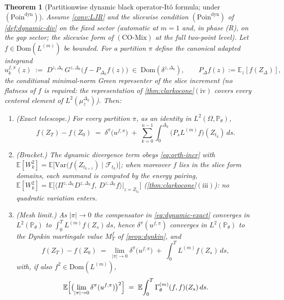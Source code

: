 \documentclass[reqno,final,11pt]{amsart}
\theoremstyle{plain}
\newtheorem{theorem}{Theorem}[section]
\theoremstyle{definition}
\theoremstyle{remark}
\newcommand{\E}{\mathbb E}
\newcommand{\Prob}{\mathbb P}
\newcommand{\Dom}{\mathrm{Dom}}
\newcommand{\cF}{\mathcal F}
\newcommand{\Pth}{\Prob_{\theta}}
\newcommand{\COmix}{(\mathrm{CO\text{-}Mix})}
\begin{document}
\begin{theorem}[Partitionwise dynamic black operator-It\^o formula; under $(\mathrm{Poin}^{\mathrm{dyn}})$]\label{thm:dynamic}
Assume \cref{conv:LJR} and the slicewise condition
$(\mathrm{Poin}^{\mathrm{dyn}})$ of \cref{def:dynamic-div} on the fixed
sector (automatic at $m=1$ and, in phase
\textnormal{(R)}, on the gap sector; the slicewise form of $\COmix$ at the
full two-point level). Let $f\in\Dom(L^{(m)})$ be bounded. For a partition $\pi$ define the
canonical adapted integrand
\[
  u^{f,\pi}_k(z)\;:=\;D^{z,\Delta_k}\,G^{z,\Delta_k}\bigl(f-P_{\Delta_k}f(z)\bigr)
  \;\in\;\Dom(\delta^{z,\Delta_k}),
  \qquad P_\Delta f(z):=\E_z[f(Z_\Delta)] ,
\]
the conditional minimal-norm Green representer of the slice increment (no
flatness of $f$ is required: the representation of
\cref{thm:clarkocone}$(\mathrm{iv})$ covers every centered element of
$L^2(\mu^{\Delta_k}_z)$). Then:
\begin{enumerate}
\item[$(\mathrm i)$] (Exact telescope.) For every partition $\pi$,
as an identity in $L^2(\Omega,\Pth)$,
\begin{equation}\label{eq:dynamic-exact}
  f(Z_T)-f(Z_0)\;=\;\delta^{\pi}\bigl(u^{f,\pi}\bigr)
  \;+\;\sum_{k=0}^{n-1}\int_0^{\Delta_k}\bigl(P_sL^{(m)}f\bigr)(Z_{t_k})\,ds .
\end{equation}
\item[$(\mathrm{ii})$] (Bracket.) The dynamic divergence term obeys
\eqref{eq:orth-incr} with
$\E[W_k^2]=\E\bigl[\mathrm{Var}\bigl(f(Z_{t_{k+1}})\mid\cF_{t_k}\bigr)\bigr]$;
when moreover $f$ lies in the slice form domains, each summand is computed by
the energy pairing,
$\E[W_k^2]=\E\bigl[\langle\Pi^{z,\Delta_k}D^{z,\Delta_k}f,\
D^{z,\Delta_k}f\rangle\big|_{z=Z_{t_k}}\bigr]$
(\cref{thm:clarkocone}$(\mathrm{iii})$): no quadratic variation enters.
\item[$(\mathrm{iii})$] (Mesh limit.) As $|\pi|\to0$ the compensator in
\eqref{eq:dynamic-exact} converges in $L^2(\Pth)$ to
$\int_0^TL^{(m)}f(Z_s)\,ds$, hence $\delta^{\pi}(u^{f,\pi})$ converges in
$L^2(\Pth)$ to the Dynkin martingale value $M^f_T$ of \cref{prop:dynkin}, and
\begin{equation}\label{eq:dynamic-limit}
  f(Z_T)-f(Z_0)\;=\;\lim_{|\pi|\to0}\delta^{\pi}\bigl(u^{f,\pi}\bigr)
  \;+\;\int_0^TL^{(m)}f(Z_s)\,ds ,
\end{equation}
with, if also $f^2\in\Dom(L^{(m)})$,
\[
  \E\Bigl[\bigl(\lim_{|\pi|\to0}\delta^{\pi}(u^{f,\pi})\bigr)^{2}\Bigr]
  \;=\;\E\!\int_0^T\Gamma^{(m)}_\theta(f,f)(Z_s)\,ds .
\]
\end{enumerate}
\end{theorem}
\end{document}
